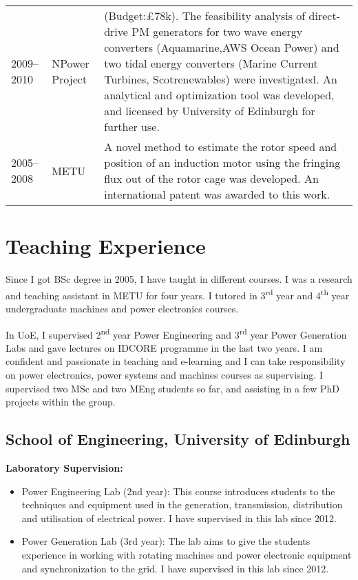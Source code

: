 \documentclass[a4paper,12pt]{article}
\begin{document}
\begin{longtable}{lp{3cm}p{12cm}}
2009--2010 & NPower Project & (Budget:£78k). The feasibility analysis of direct-drive PM generators for two wave energy converters (Aquamarine,AWS Ocean Power) and two tidal energy converters (Marine Current Turbines, Scotrenewables) were investigated. An analytical and optimization tool was developed, and licensed by University of Edinburgh for further use.\\
2005--2008 & METU & A novel method to estimate the rotor speed and position of an induction motor using the fringing flux out of the rotor cage was developed. An international patent was awarded to this work.\\
\end{longtable}

\clearpage

\section{Teaching Experience}

Since I got BSc degree in 2005, I have taught in different courses. I was a research and teaching assistant in METU for four years. I tutored in 3\textsuperscript{rd} year and 4\textsuperscript{th} year undergraduate machines and power electronics courses.

In UoE, I supervised 2\textsuperscript{nd} year Power Engineering and 3\textsuperscript{rd} year Power Generation Labs and gave lectures on IDCORE programme in the last two years. I am confident and passionate in teaching and e-learning and I can take responsibility on power electronics, power systems and machines courses as supervising. I supervised two MSc and two MEng students so far, and assisting in a few PhD projects within the group.

\subsection{School of Engineering, University of Edinburgh}

\textbf{Laboratory Supervision:}
\begin{itemize}
\item Power Engineering Lab (2nd year): This course introduces students to the techniques and equipment used in the generation, transmission, distribution and utilisation of electrical power. I have supervised in this lab since 2012.
\item Power Generation Lab (3rd year): The lab aims to give the students experience in working with rotating machines and power electronic equipment and synchronization to the grid. I have supervised in this lab since 2012.

\end{itemize}
\end{document}
